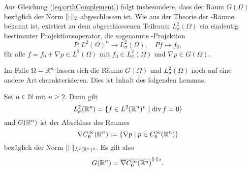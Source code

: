 Aus Gleichung (\ref{eq:orthComplement}) folgt insbesondere, dass der Raum $G(\Omega)$ bezüglich der Norm $\lVert \cdot \rVert_2$ abgeschlossen ist.
Wie aus der Theorie der \hilbert\hyp{}Räume bekannt ist, existiert zu dem abgeschlossenen Teilraum $L_\sigma^2(\Omega)$ ein eindeutig bestimmter Projektionsoperator, die sogenannte \helmholtz\hyp{}Projektion
$$
P \colon L^2(\Omega)^n \to L_\sigma^2(\Omega),\quad Pf \mapsto f_0,
$$
für alle $f = f_0 + \nabla p \in L^2(\Omega)$ mit $f_0 \in L_\sigma^2(\Omega)$ und $\nabla p \in G(\Omega)$.

Im Falle $\Omega = \mathbb{R}^n$ lassen sich die Räume $G(\Omega)$ und $L_\sigma^2(\Omega)$ noch auf eine andere Art charakterisieren.
Dies ist Inhalt des folgenden Lemmas.

\begin{thm}
  Sei $n \in \mathbb{N}$ mit $n \geq 2$.
  Dann gilt
  \begin{equation}
    \label{eq:LCharacterization}
    L_\sigma^2(\mathbb{R}^n) = \{ f \in L^2(\mathbb{R}^n)^n \mid \mathrm{div\,} f = 0 \}
  \end{equation}
  und $G(\mathbb{R}^n)$ ist der Abschluss des Raumes
  $$
  \nabla C_0^\infty(\mathbb{R}^n) := \{ \nabla p \mid p \in C_0^\infty(\mathbb{R}^n) \}
  $$
  bezüglich der Norm $\lVert \cdot \rVert_{L^2(\mathbb{R}^n)^n}$.
  Es gilt also
  \begin{equation}
    \label{eq:GCharacterization}
    G(\mathbb{R}^n) = \overline{\nabla C_0^\infty(\mathbb{R}^n)}^{\lVert \cdot \rVert_2}.
  \end{equation}
\end{thm}

